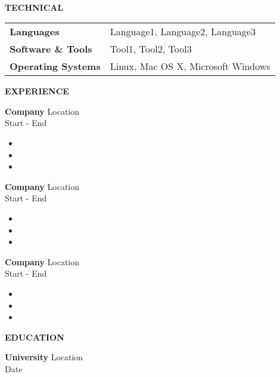 \documentclass[10pt]{article}
\newcommand{\verticalspace}{\vspace{2.0mm}}
\newcommand{\horizontalrule}{\noindent\hrulefill}
\newcommand{\heading}{\noindent\Large\bf} %
\newcommand{\headingspace}{\vspace{3.5mm}}
\begin{document}
\renewcommand\familydefault{\sfdefault}




\noindent{\huge\bf \fullname}
\hfill

\vspace{-2mm}
\horizontalrule

\noindent 
\href{mailto:\email}{\email}
\hfill
\href{https://\website}{\website}
\hfill
\href{https://\linkedin}{\linkedin}
\\
\noindent \phonenumber
\hfill
\href{https://\github}{\github}

\headingspace
{\heading TECHNICAL}

\verticalspace

\begin{tabular}{@{} p{.2\linewidth} p{.75\linewidth}}

{\bf Languages} & Language1, Language2, Language3 \\

{\bf Software \& Tools} & Tool1, Tool2, Tool3 \\

{\bf Operating Systems} & Linux, Mac OS X, Microsoft Windows

\end{tabular}

{\heading EXPERIENCE}

\verticalspace

{\bf Company} \hfill Location \\
 \hfill Start - End
\begin{itemize}
\item 
\item 
\item
\end{itemize}

\verticalspace

\verticalspace

{\bf Company} \hfill Location \\
 \hfill Start - End
\begin{itemize}
\item 
\item 
\item
\end{itemize}

\verticalspace

{\bf Company} \hfill Location \\
 \hfill Start - End
\begin{itemize}
\item 
\item 
\item
\end{itemize}

\headingspace
{\heading EDUCATION}

\verticalspace

{\bf University} \hfill Location \\
 \hfill Date
\end{document}

